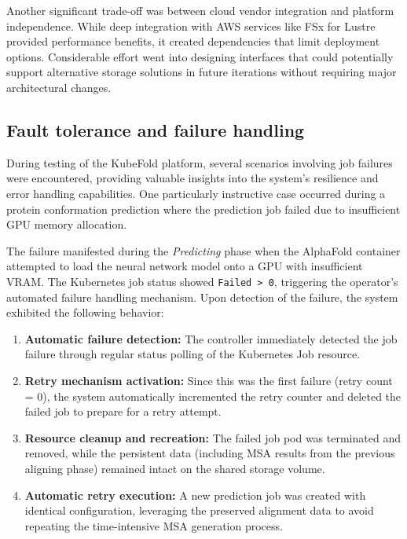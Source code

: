 Another significant trade-off was between cloud vendor integration and platform independence. While deep integration with AWS services like FSx for Lustre provided performance benefits, it created dependencies that limit deployment options. Considerable effort went into designing interfaces that could potentially support alternative storage solutions in future iterations without requiring major architectural changes.

\subsection{Fault tolerance and failure handling}

During testing of the KubeFold platform, several scenarios involving job failures were encountered, providing valuable insights into the system's resilience and error handling capabilities. One particularly instructive case occurred during a protein conformation prediction where the prediction job failed due to insufficient GPU memory allocation.

The failure manifested during the \textit{Predicting} phase when the AlphaFold container attempted to load the neural network model onto a GPU with insufficient VRAM. The Kubernetes job status showed \texttt{Failed > 0}, triggering the operator's automated failure handling mechanism. Upon detection of the failure, the system exhibited the following behavior:

\begin{enumerate}
    \item \textbf{Automatic failure detection:} The controller immediately detected the job failure through regular status polling of the Kubernetes Job resource.
    
    \item \textbf{Retry mechanism activation:} Since this was the first failure (retry count = 0), the system automatically incremented the retry counter and deleted the failed job to prepare for a retry attempt.
    
    \item \textbf{Resource cleanup and recreation:} The failed job pod was terminated and removed, while the persistent data (including MSA results from the previous aligning phase) remained intact on the shared storage volume.
    
    \item \textbf{Automatic retry execution:} A new prediction job was created with identical configuration, leveraging the preserved alignment data to avoid repeating the time-intensive MSA generation process.
\end{enumerate}

